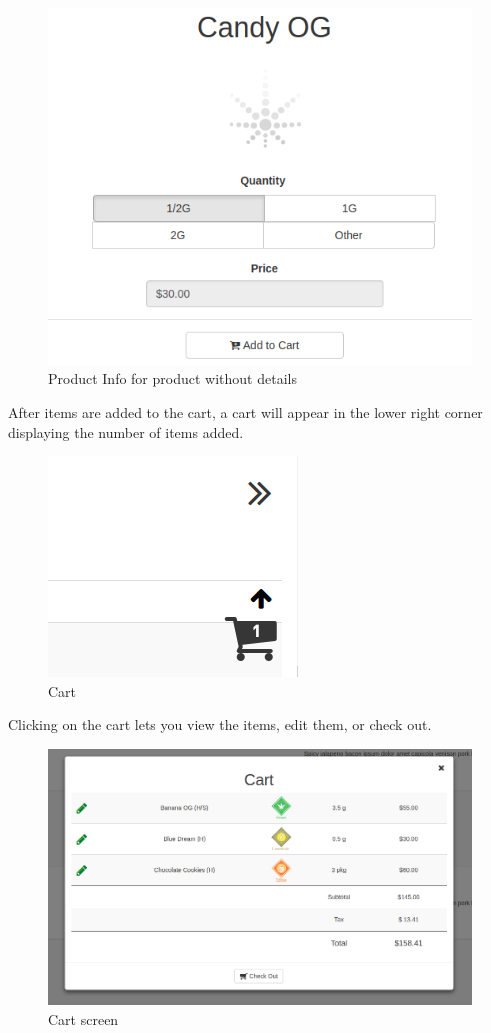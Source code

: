 \documentclass[]{book}
\theoremstyle{definition}
\theoremstyle{definition}
\theoremstyle{definition}
\theoremstyle{remark}
\begin{document}
\begin{figure}
\centering
\includegraphics{images/M5.png}
\caption{Product Info for product without details}
\end{figure}

After items are added to the cart, a cart will appear in the lower right
corner displaying the number of items added.

\begin{figure}
\centering
\includegraphics{images/M6.png}
\caption{Cart}
\end{figure}

Clicking on the cart lets you view the items, edit them, or check out.

\begin{figure}
\centering
\includegraphics{images/M7.png}
\caption{Cart screen}
\end{figure}
\end{document}
